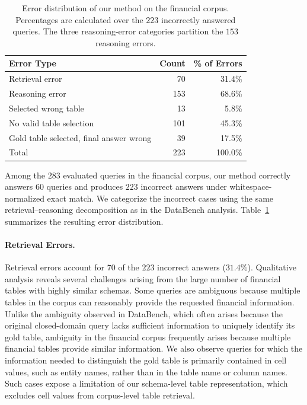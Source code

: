 \begin{table}[t]
\centering
\small
\begin{tabular}{lrr}
\hline
\textbf{Error Type} & \textbf{Count} & \textbf{\% of Errors} \\
\hline
Retrieval error & 70 & 31.4\% \\
Reasoning error & 153 & 68.6\% \\
\quad Selected wrong table & 13 & 5.8\% \\
\quad No valid table selection & 101 & 45.3\% \\
\quad Gold table selected, final answer wrong & 39 & 17.5\% \\
\hline
Total & 223 & 100.0\% \\
\hline
\end{tabular}
\caption{Error distribution of our method on the financial corpus.
Percentages are calculated over the $223$ incorrectly answered queries.
The three reasoning-error categories partition the $153$ reasoning errors.}
\label{tab:financial_error_distribution}
\end{table}

Among the $283$ evaluated queries in the financial corpus, our method correctly answers $60$ queries and produces $223$ incorrect answers under whitespace-normalized exact match.
We categorize the incorrect cases using the same retrieval--reasoning decomposition as in the DataBench analysis.
Table~\ref{tab:financial_error_distribution} summarizes the resulting error distribution.

\paragraph{Retrieval Errors.}
Retrieval errors account for $70$ of the $223$ incorrect answers ($31.4\%$).
Qualitative analysis reveals several challenges arising from the large number of financial tables with highly similar schemas.
Some queries are ambiguous because multiple tables in the corpus can reasonably provide the requested financial information.
Unlike the ambiguity observed in DataBench, which often arises because the original closed-domain query lacks sufficient information to uniquely identify its gold table, ambiguity in the financial corpus frequently arises because multiple financial tables provide similar information.
We also observe queries for which the information needed to distinguish the gold table is primarily contained in cell values, such as entity names, rather than in the table name or column names.
Such cases expose a limitation of our schema-level table representation, which excludes cell values from corpus-level table retrieval.

